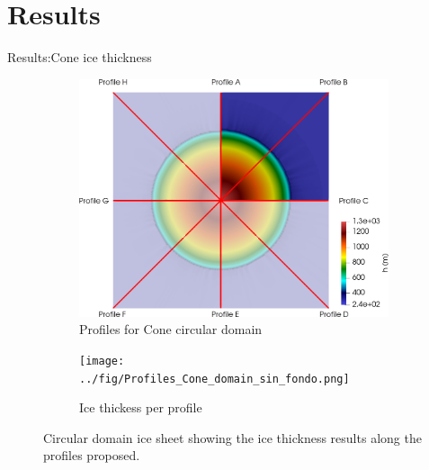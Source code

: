 \documentclass[11pt]{beamer}
\begin{document}
	\section{Results}
		\begin{frame}{Results:Cone ice thickness}
		\justifying
		\begin{figure}
			\centering
			\begin{subfigure}{.5\textwidth}
				\centering
				\includegraphics[width=0.99\linewidth]{../fig/Profiles_Cone_combined_domains.png}
				\caption{Profiles for Cone circular domain}
				\label{Schematic_Cone}
			\end{subfigure}%
			\begin{subfigure}{.5\textwidth}
				\centering
				\texttt{[image: ../fig/Profiles\_Cone\_domain\_sin\_fondo.png]}
				\caption{Ice thickess per profile}
				\label{Profiles_cone}
			\end{subfigure}
			\caption{Circular domain ice sheet showing the ice thickness results along the profiles proposed.}
			\label{Cone_scheme}
		\end{figure}
		\end{frame}
\end{document}
